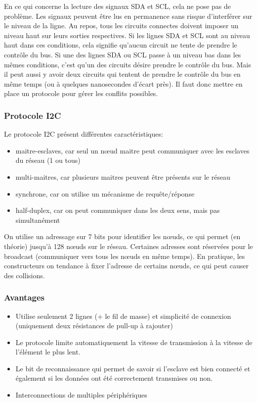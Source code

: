 \documentclass[french,a4paper,12pt]{report}
\begin{document}
En ce qui concerne la lecture des signaux SDA et SCL, cela ne pose pas de problème. Les signaux peuvent être lus en permanence sans risque d'interférer sur le niveau de la ligne.
Au repos, tous les circuits connectes doivent imposer un niveau haut sur leurs sorties respectives. Si les lignes SDA et SCL sont au niveau haut dans ces conditions, cela signifie qu'aucun circuit ne tente de prendre le contrôle du bus. Si une des lignes SDA ou SCL passe à un niveau bas dans les mêmes conditions, c'est qu'un des circuits désire prendre le contrôle du bus. Mais il peut aussi y avoir deux circuits qui tentent de prendre le contrôle du bus en même temps (ou à quelques nanosecondes d'écart près). Il faut donc mettre en place un protocole pour gérer les conflits possibles.

   		\subsubsection{Protocole I2C}
	Le protocole I2C présent différentes caractéristiques:
 
			\begin{itemize}
			\item maitre-esclaves, car seul un nœud maitre peut communiquer avec les esclaves du réseau (1 ou tous)
			\item multi-maitres, car plusieurs maitres peuvent être présents sur le réseau
			\item synchrone, car on utilise un mécanisme de requête/réponse
			\item half-duplex, car on peut communiquer dans les deux sens, mais pas simultanément
			\end{itemize}
 
On utilise un adressage sur 7 bits pour identifier les nœuds, ce qui permet (en théorie) jusqu’à 128 nœuds sur le réseau. Certaines adresses sont réservées pour le broadcast (communiquer vers tous les nœuds en même temps). En pratique, les constructeurs on tendance à fixer l’adresse de certains nœuds, ce qui peut causer des collisions.
 
 
  		\subsubsection{Avantages}
			\begin{itemize}
			\item Utilise seulement 2 lignes (+ le fil de masse) et simplicité de connexion (uniquement deux résistances de pull-up à rajouter) 
			\item Le protocole limite automatiquement la vitesse de transmission à la vitesse de l’élément le plus lent. 
			\item Le bit de reconnaissance qui permet de savoir si l’esclave est bien connecté et également si les données ont été correctement transmises ou non. 
			\item Interconnections de multiples périphériques
			\end{itemize}
 
\end{document}
